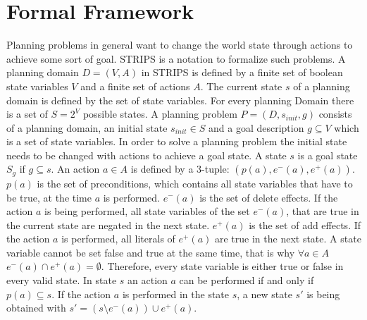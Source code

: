 \chapter{Formal Framework}

Planning problems in general want to change the world state through actions to achieve some sort of goal.
STRIPS \cite{STRIPS} is a notation to formalize such problems.
A planning domain $D=(V,A)$ in STRIPS is defined by a finite set of boolean state variables $V$ and a finite set of actions $A$.
The current state $s$ of a planning domain is defined by the set of state variables.
For every planning Domain there is a set of $S=2^V$ possible states.
A planning problem $P=(D,s_{init},g)$ consists of a planning domain,
an initial state $s_{init} \in S$ and a goal description $g \subseteq V$ which is a set
of state variables. In order to solve a planning problem the initial state needs to be changed with actions to achieve a goal state.
A state $s$ is a goal state $S_g$ if $g \subseteq s$.
An action $a \in A$ is defined by a 3-tuple: $(p(a),e^-(a),e^+(a))$. $p(a)$ is the set of preconditions, which
contains all state variables that have to be true, at the time $a$ is performed. $e^-(a)$ is the set of delete effects. If the action $a$
is being performed, all state variables of the set $e^-(a)$, that are true in the current state are negated in the next state.
$e^+(a)$ is the set of add effects. If the action $a$ is performed, all literals of $e^+(a)$ are true in the
next state. A state variable cannot be set false and true at the same time, that is why $\forall a \in A$ $e^-(a) \cap e^+(a) = \emptyset$. 
Therefore, every state variable is either true or false in every valid state. In state
$s$ an action $a$ can be performed if and only if $p(a) \subseteq s$. If the action $a$ is performed in the state $s$, a new state 
$s'$ is being obtained with $s'=(s\setminus e^-(a))\cup e^+(a)$.
